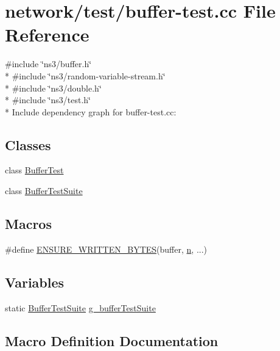 \hypertarget{buffer-test_8cc}{}\section{network/test/buffer-\/test.cc File Reference}
\label{buffer-test_8cc}
{\ttfamily \#include \char`\"{}ns3/buffer.\+h\char`\"{}}\\*
{\ttfamily \#include \char`\"{}ns3/random-\/variable-\/stream.\+h\char`\"{}}\\*
{\ttfamily \#include \char`\"{}ns3/double.\+h\char`\"{}}\\*
{\ttfamily \#include \char`\"{}ns3/test.\+h\char`\"{}}\\*
Include dependency graph for buffer-\/test.cc\+:
\subsection*{Classes}
\begin{DoxyCompactItemize}
\item 
class \hyperlink{classBufferTest}{Buffer\+Test}
\item 
class \hyperlink{classBufferTestSuite}{Buffer\+Test\+Suite}
\end{DoxyCompactItemize}
\subsection*{Macros}
\begin{DoxyCompactItemize}
\item 
\#define \hyperlink{buffer-test_8cc_adb8db1b0f6eec9da1f9f6d8b9f1e4ba8}{E\+N\+S\+U\+R\+E\+\_\+\+W\+R\+I\+T\+T\+E\+N\+\_\+\+B\+Y\+T\+ES}(buffer,  \hyperlink{lte__link__budget__x2__handover__measures_8m_abdb05bc5a064cf642a06c83b3392f148}{n}, ...)
\end{DoxyCompactItemize}
\subsection*{Variables}
\begin{DoxyCompactItemize}
\item 
static \hyperlink{classBufferTestSuite}{Buffer\+Test\+Suite} \hyperlink{buffer-test_8cc_a5699629ba4dc35b8ca19d2b7132426fd}{g\+\_\+buffer\+Test\+Suite}
\end{DoxyCompactItemize}


\subsection{Macro Definition Documentation}
